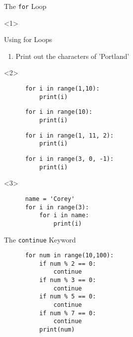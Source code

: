 \documentclass[../main.tex]{subfiles}
\begin{document}
\begin{frame}[fragile]{The \texttt{for} Loop}

  \begin{onlyenv}<1>
    \begin{exercise}{Using for Loops}
    \begin{enumerate} \justifying
    \item Print out the characters of 'Portland'
    \end{enumerate}
  \end{exercise}
  \end{onlyenv}

  \begin{onlyenv}<2>
    \begin{code}{}
    \begin{lstlisting}
      for i in range(1,10):
          print(i)
    \end{lstlisting}
  \end{code}
  
  \begin{code}{}
    \begin{lstlisting}
      for i in range(10):
          print(i)
    \end{lstlisting}
  \end{code}

    \begin{code}{}
    \begin{lstlisting}
      for i in range(1, 11, 2):
          print(i)
    \end{lstlisting}
  \end{code}

    \begin{code}{}
    \begin{lstlisting}
      for i in range(3, 0, -1):
          print(i)
    \end{lstlisting}
  \end{code}
\end{onlyenv}

\begin{onlyenv}<3>
    \begin{code}{}
    \begin{lstlisting}
      name = 'Corey'
      for i in range(3):
          for i in name:
              print(i)
    \end{lstlisting}
  \end{code}
\end{onlyenv}
\end{frame}

\begin{frame}[fragile]{The \texttt{continue} Keyword}
  \begin{code}{}
    \begin{lstlisting}
      for num in range(10,100):
          if num % 2 == 0:
              continue
          if num % 3 == 0:
              continue
          if num % 5 == 0:
              continue
          if num % 7 == 0:
              continue
          print(num)
    \end{lstlisting}
  \end{code}
\end{frame}
\end{document}
